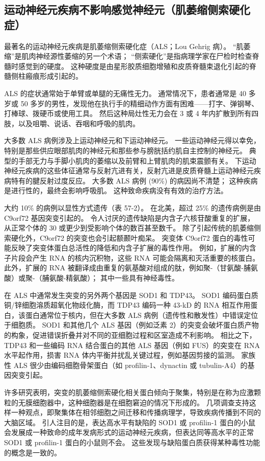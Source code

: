 \subsection{运动神经元疾病不影响感觉神经元（肌萎缩侧索硬化症）}

最著名的运动神经元疾病是肌萎缩侧索硬化症（ALS；Lou Gehrig 病）。
“肌萎缩”是肌肉神经源性萎缩的另一个术语；
“侧索硬化”是指病理学家在尸检时检查脊髓时感觉到的硬度。
这种硬度是由星形胶质细胞增殖和皮质脊髓束退化引起的脊髓侧柱瘢痕形成引起的。


ALS 的症状通常始于单臂或单腿的无痛性无力。
通常情况下，患者通常是 40 多岁或 50 多岁的男性，发现他在执行手的精细动作方面有困难——打字、弹钢琴、打棒球、拨硬币或使用工具。
然后这种局灶性无力会在 3 或 4 年内扩散到所有四肢，以及咀嚼、说话、吞咽和呼吸的肌肉。


大多数 ALS 病例涉及上运动神经元和下运动神经元。
一些运动神经元得以幸免，特别是那些供应眼部肌肉的神经元和那些参与膀胱括约肌自主控制的神经元。
典型的手部无力与手脚小肌肉的萎缩以及前臂和上臂肌肉的肌束震颤有关。
下运动神经元疾病的这些体征通常与反射亢进有关，反射亢进是皮质脊髓上运动神经元疾病特有的腱反射过度反应。
大多数 ALS 病例 (90\%) 的病因尚不清楚；
这种疾病是进行性的，最终会影响呼吸肌。
这种致命疾病没有有效的治疗方法。


大约 10\% 的病例以显性方式遗传（表 57-2）。
在北美，超过 25\% 的遗传病例是由 C9orf72 基因突变引起的。
令人讨厌的遗传缺陷是内含子六核苷酸重复的扩展，从正常个体的 30 或更少到受影响个体的数百甚至数千。
除了引起传统的肌萎缩侧索硬化外，C9orf72 的突变也会引起额颞叶痴呆。
突变体 C9orf72 蛋白的毒性可能反映了突变体蛋白总活性的降低和内含子扩展的毒性作用。
例如，扩展的内含子片段会产生 RNA 的核内沉积物，这些 RNA 可能会隔离和灭活重要的核蛋白。
此外，扩展的 RNA 被翻译成由重复的氨基酸对组成的肽，例如聚-（甘氨酸-脯氨酸）或聚-（脯氨酸-精氨酸）；
其中一些具有神经毒性。


在 ALS 中通常发生突变的另外两个基因是 SOD1 和 TDP43。
SOD1 编码蛋白质铜/锌细胞溶质超氧化物歧化酶，而 TDP43 编码一种 43-kD 的 RNA 相互作用蛋白，该蛋白通常位于核内，但在大多数 ALS 病例（遗传性和散发性）中错误定位于细胞质。
SOD1 和其他几个 ALS 基因（例如泛素 2）的突变会破坏蛋白质产物的构象，促进错误折叠并对不同的亚细胞过程和区室造成不利影响。
相比之下，TDP43 和一些编码 RNA 结合蛋白的其他 ALS 基因（例如 FUS）的突变在 RNA 水平起作用，损害 RNA 体内平衡并扰乱关键过程，例如基因剪接的监测。
家族性 ALS 很少由编码细胞骨架蛋白（如 profilin-1、dynactin 或 tubulin-A4）的基因突变引起。


许多研究表明，突变的肌萎缩侧索硬化相关蛋白倾向于聚集，特别是在称为应激颗粒的无膜细胞器中，这种细胞器是在细胞窘迫的情况下形成的。
几项调查支持这样一种观点，即聚集体在相邻细胞之间迁移和传播病理学，导致疾病传播到不同的大脑区域。
引人注目的是，表达高水平有缺陷的 SOD1 或 profilin-1 蛋白的小鼠会发展成一种致命的成年发病形式的运动神经元疾病，但表达同等高水平的正常 SOD1 或 profilin-1 蛋白的小鼠则不会。
这些发现与缺陷蛋白质获得某种毒性功能的概念是一致的。


